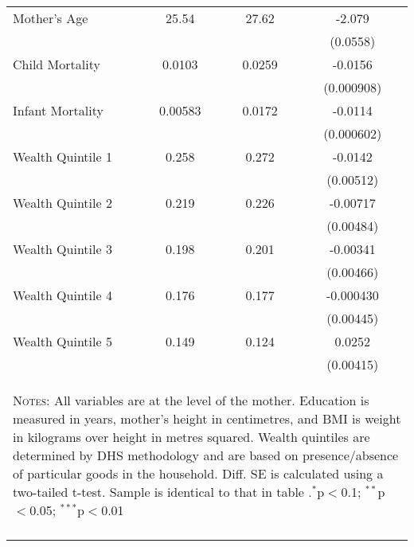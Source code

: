 \begin{table}[htbp]
\begin{tabular}{l*{1}{ccc}}
Mother's Age        &       25.54&       27.62&      -2.079\sym{***}\\
                    &            &            &    (0.0558)         \\
Child Mortality     &      0.0103&      0.0259&     -0.0156\sym{***}\\
                    &            &            &  (0.000908)         \\
Infant Mortality    &     0.00583&      0.0172&     -0.0114\sym{***}\\
                    &            &            &  (0.000602)         \\
Wealth Quintile 1   &       0.258&       0.272&     -0.0142\sym{**} \\
                    &            &            &   (0.00512)         \\
Wealth Quintile 2   &       0.219&       0.226&    -0.00717         \\
                    &            &            &   (0.00484)         \\
Wealth Quintile 3   &       0.198&       0.201&    -0.00341         \\
                    &            &            &   (0.00466)         \\
Wealth Quintile 4   &       0.176&       0.177&   -0.000430         \\
                    &            &            &   (0.00445)         \\
Wealth Quintile 5   &       0.149&       0.124&      0.0252\sym{***}\\
                    &            &            &   (0.00415)         \\
\midrule\midrule


\multicolumn{4}{p{10.4cm}}{\begin{footnotesize}\textsc{Notes:} All variables are at the level of the mother.  Education is measured in years, mother's height in centimetres, and BMI is weight in kilograms over height in metres squared.  Wealth quintiles are determined by DHS methodology and are based on presence/absence of particular goods in the household. Diff. SE is calculated using a two-tailed t-test.  Sample is identical to that in table \label{TWINtab:sumstats}.$^{*}$p$<$0.1; $^{**}$p$<$0.05; $^{***}$p$<$0.01\end{footnotesize}}
\\\bottomrule\normalsize\end{tabular}\end{table} 
